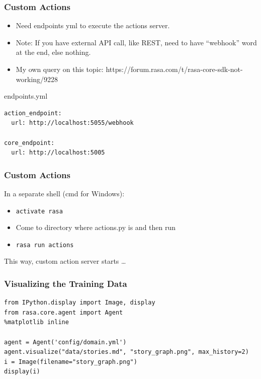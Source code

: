 \begin{frame}[fragile]\frametitle{Custom Actions}

\begin{itemize}
\item Need endpoints yml to execute the actions server.
\item Note: If you have external API call, like REST, need to have ``webhook'' word at the end, else nothing.
\item My own query on this topic: https://forum.rasa.com/t/rasa-core-sdk-not-working/9228
\end{itemize}

endpoints.yml
\begin{lstlisting}
action_endpoint:
  url: http://localhost:5055/webhook

core_endpoint:
  url: http://localhost:5005
\end{lstlisting}
\end{frame}

 \begin{frame}[fragile]\frametitle{Custom Actions}

 In a separate shell (cmd for Windows):
 
\begin{itemize}
\item \lstinline|activate rasa|
\item Come to directory where actions.py is and then run
\item \lstinline|rasa run actions|
\end{itemize}

This way, custom action server starts \ldots
\end{frame}

 \begin{frame}[fragile]\frametitle{Visualizing the Training Data}


\begin{lstlisting}
from IPython.display import Image, display
from rasa.core.agent import Agent
%matplotlib inline

agent = Agent('config/domain.yml')
agent.visualize("data/stories.md", "story_graph.png", max_history=2)
i = Image(filename="story_graph.png")
display(i)
\end{lstlisting}

\end{frame}

